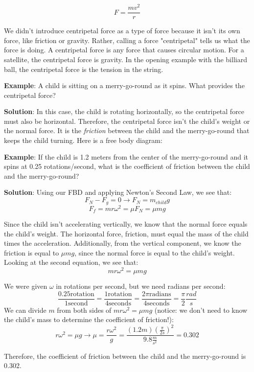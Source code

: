 $$F = \frac{m v^2}{r}$$

We didn't introduce centripetal force as a type of force because it isn't its own force, like friction or gravity. Rather, calling a force "centripetal" tells us what the force is doing. A centripetal force is any force that causes circular motion. For a satellite, the centripetal force is gravity. In the opening example with the billiard ball, the centripetal force is the tension in the string. 

\textbf{Example}: A child is sitting on a merry-go-round as it spins. What provides the centripetal force? 

\textbf{Solution}: In this case, the child is rotating horizontally, so the centripetal force must also be horizontal. Therefore, the centripetal force isn't the child's weight or the normal force. It is the \textit{friction} between the child and the merry-go-round that keeps the child turning. Here is a free body diagram:


\textbf{Example}: If the child is 1.2 meters from the center of the merry-go-round and it spins at 0.25 rotations/second, what is the coefficient of friction between the child and the merry-go-round?

\textbf{Solution}: Using our FBD and applying Newton's Second Law, we see that:
$$F_N - F_g = 0 \to F_N = m_{child}g$$
$$F_f = m r \omega^2 = \mu F_N = \mu m g$$

Since the child isn't accelerating vertically, we know that the normal force equals the child's weight. The horizontal force, friction, must equal the mass of the child times the acceleration. Additionally, from the vertical component, we know the friction is equal to $\mu m g$, since the normal force is equal to the child's weight. Looking at the second equation, we see that:
$$m r \omega^2 = \mu m g$$

We were given $\omega$ in rotations per second, but we need radians per second:
$$\frac{0.25 \text{rotation}}{1 \text{second}} = \frac{1 \text{rotation}}{4 \text{seconds}} = \frac{2\pi \text{radians}}{4 \text{seconds}} = \frac{\pi}{2} \frac{rad}{s}$$
We can divide $m$ from both sides of $mr\omega^2 = \mu m g$ (notice: we don't need to know the child's mass to determine the coefficient of friction!):
$$r \omega^2 = \mu g \to \mu = \frac{r \omega^2}{g} = \frac{\left( 1.2 m \right) \left( \frac{\pi}{2 s} \right)^2}{9.8 \frac{m}{s^2}} = 0.302$$

Therefore, the coefficient of friction between the child and the merry-go-round is 0.302. 

